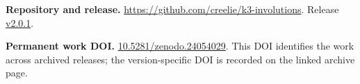 \par\textbf{Repository and release.} \url{https://github.com/creelie/k3-involutions}. Release \href{https://github.com/creelie/k3-involutions/releases/tag/v2.0.1}{v2.0.1}.
\par\textbf{Permanent work DOI.} \href{https://doi.org/10.5281/zenodo.24054029}{10.5281/zenodo.24054029}. This DOI identifies the work across archived releases; the version-specific DOI is recorded on the linked archive page.

